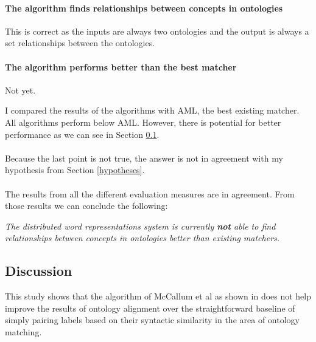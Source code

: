 \documentclass{article}
\begin{document}
\paragraph{The algorithm finds relationships between concepts in ontologies}
This is correct as the inputs are always two ontologies and the output is always a set relationships between the ontologies.
\paragraph{The algorithm performs better than the best matcher}

Not yet.

I compared the results of the algorithms with AML, the best existing matcher. All algorithms perform below AML. However, there is potential for better performance as we can see in Section \ref{discussion}.
\paragraph{}
 Because the last point is not true, the answer is not in agreement with my hypothesis from Section \ref{hypotheses}.
 \paragraph{}
The results from all the different evaluation measures are in agreement. From those results we can conclude the following:

 \begin{center}
 \textit{
 The distributed word representations system is currently \textbf{not} able to find relationships between concepts in ontologies better than existing matchers.
 }
 \end{center}
 
 
 \subsection{Discussion} \label{discussion}
 
 
 
 
 
  This study shows that the algorithm of McCallum et al as shown in \cite{mccallumweblecture} does not help improve the results of ontology alignment over the straightforward baseline of simply pairing labels based on their syntactic similarity in the area of ontology matching. 
\end{document}
